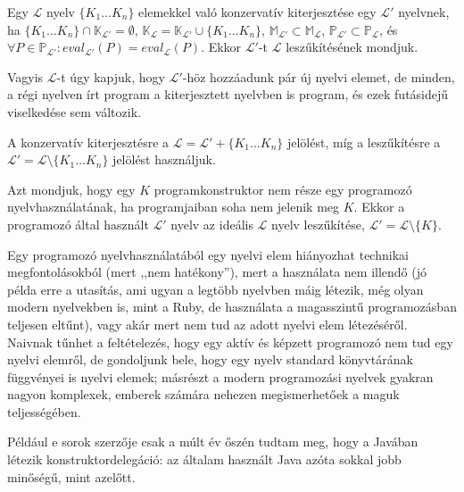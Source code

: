 \begin{defn}
	Egy $\mathcal{L}$ nyelv $\{K_1 \ldots K_n\}$ elemekkel való konzervatív kiterjesztése egy $\mathcal{L}'$ nyelvnek, ha
	$ \{K_1 \ldots K_n\} \cap \mathbb{K}_{\mathcal{L}'} = \emptyset$,
	$\mathbb{K}_\mathcal{L} = \mathbb{K}_{\mathcal{L}'} \cup \{K_1 \ldots K_n\}$,
	$\mathbb{M}_{\mathcal{L}'} \subset \mathbb{M}_\mathcal{L}$, $\mathbb{P}_{\mathcal{L}'} \subset \mathbb{P}_\mathcal{L}$, és $ \forall P \in \mathbb{P}_{\mathcal{L}'}: eval_{\mathcal{L}'}(P) = eval_\mathcal{L}(P)$. Ekkor $\mathcal{L}'$-t $\mathcal{L}$ leszűkítésének mondjuk.

	\normalfont Vagyis $\mathcal{L}$-t úgy kapjuk, hogy $\mathcal{L}'$-höz hozzáadunk pár új nyelvi elemet, de minden, a régi nyelven írt program a kiterjesztett nyelvben is program, és ezek futásidejű viselkedése sem változik.

	\normalfont A konzervatív kiterjesztésre a $\mathcal{L} = \mathcal{L}' + \{K_1 \ldots K_n\}$ jelölést, míg a leszűkítésre a $\mathcal{L}' = \mathcal{L} \setminus \{K_1 \ldots K_n\}$ jelölést használjuk.
\end{defn}


\begin{defn}[Nyelvhasználat]
Azt mondjuk, hogy egy $K$ programkonstruktor nem része egy programozó nyelvhasználatának, ha programjaiban soha nem jelenik meg $K$.
Ekkor a programozó által használt $\mathcal{L}'$ nyelv az ideális $\mathcal{L}$ nyelv leszűkítése, $\mathcal{L}' = \mathcal{L} \setminus \{K\}$.

\normalfont Egy programozó nyelvhasználatából egy nyelvi elem hiányozhat technikai megfontolásokból (mert ,,nem hatékony''), mert a használata nem illendő (jó példa erre a  utasítás, ami ugyan a legtöbb nyelvben máig létezik, még olyan modern nyelvekben is, mint a Ruby, de használata a magasszintű programozásban teljesen eltűnt), vagy akár mert nem tud az adott nyelvi elem létezéséről.
Naivnak tűnhet a feltételezés, hogy egy aktív és képzett programozó nem tud egy nyelvi elemről, de gondoljunk bele, hogy egy nyelv standard könyvtárának függvényei is nyelvi elemek; másrészt a modern programozási nyelvek gyakran nagyon komplexek, emberek számára nehezen megismerhetőek a maguk teljességében.

Például e sorok szerzője csak a múlt év őszén tudtam meg, hogy a Javában létezik konstruktordelegáció: az általam használt Java azóta sokkal jobb minőségű, mint azelőtt.
\end{defn}


